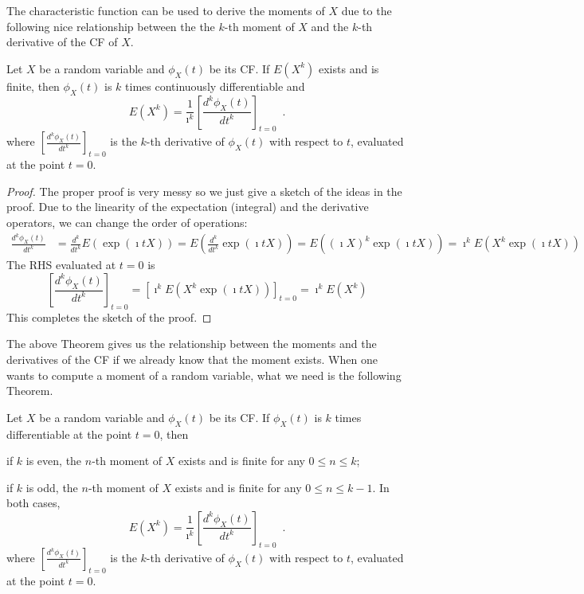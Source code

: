 The characteristic function can be used to derive the moments of $X$ due to the following nice relationship between the the $k$-th moment of $X$ and the $k$-th derivative of the CF of $X$.

\begin{framed}
\begin{prop}[Moment \& CF.]
Let $X$ be a random variable and $\phi_X(t)$ be its CF.  
If $E(X^k)$ exists and is finite, then $\phi_X(t)$ is $k$ times continuously differentiable and
\begin{equation*}
E(X^k) = \frac{1}{\imath^k} \left[\frac{d^k \phi_X(t)}{dt^k}\right]_{t=0} \enspace .
\end{equation*}
where $\left[\frac{d^k \phi_X(t)}{dt^k}\right]_{t=0}$ is the $k$-th derivative of $\phi_X(t)$ with respect to $t$, evaluated at the point $t=0$.
\end{prop}
\end{framed}

\begin{proof}
The proper proof is very messy so we just give a sketch of the ideas in the proof.  
Due to the linearity of the expectation (integral) and the derivative operators, we can change the order of operations:
\begin{align*}
\frac{d^k \phi_X(t)}{dt^k}
&= \frac{d^k}{dt^k} E(\exp(\imath t X))
= E \left( \frac{d^k}{dt^k} \exp(\imath t X) \right)
= E \left( (\imath X)^k \exp(\imath t X) \right)
= \imath^k E \left( X^k \exp(\imath t X) \right)
\end{align*}
The RHS evaluated at $t=0$ is
\[
\left[ \frac{d^k \phi_X(t)}{dt^k} \right]_{t=0}
= \left[ \imath^k E \left( X^k \exp(\imath t X) \right) \right]_{t=0} 
= \imath^k E \left( X^k \right)
\]
This completes the sketch of the proof.
\end{proof}

The above Theorem gives us the relationship between the moments and the derivatives of the CF if we already know that the moment exists.  
When one wants to compute a moment of a random variable, what we need is the following Theorem.

\begin{framed}
\begin{prop}
Let $X$ be a random variable and $\phi_X(t)$ be its CF.  
If $\phi_X(t)$ is $k$ times differentiable at the point $t=0$, then
\be
\item if $k$ is even, the $n$-th moment of $X$ exists and is finite for any $0 \leq n \leq k$;
\item if $k$ is odd, the $n$-th moment of $X$ exists and is finite for any $0 \leq n \leq k-1$.
\ee
In both cases,
\begin{equation}\label{E:CFToMoments}
E(X^k) = \frac{1}{\imath^k} \left[\frac{d^k \phi_X(t)}{dt^k}\right]_{t=0} \enspace .
\end{equation}
where $\left[\frac{d^k \phi_X(t)}{dt^k}\right]_{t=0}$ is the $k$-th derivative of $\phi_X(t)$ with respect to $t$, evaluated at the point $t=0$.
\end{prop}
\end{framed}

